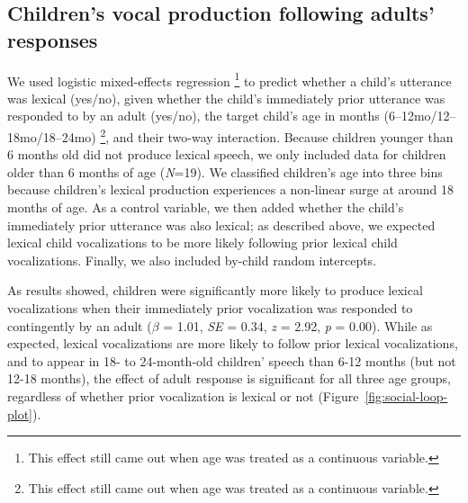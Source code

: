 \documentclass[
  man]{apa6}
\begin{document}
\hypertarget{childrens-vocal-production-following-adults-responses}{%
\subsection{Children's vocal production following adults' responses}\label{childrens-vocal-production-following-adults-responses}}

We used logistic mixed-effects regression \footnote{This effect still came out when age was treated as a continuous variable.} to predict whether a child's utterance was lexical (yes/no), given whether the child's immediately prior utterance was responded to by an adult (yes/no), the target child's age in months (6--12mo/12--18mo/18--24mo) \footnote{This effect still came out when age was treated as a continuous variable.}, and their two-way interaction. Because children younger than 6 months old did not produce lexical speech, we only included data for children older than 6 months of age (\emph{N}=19). We classified children's age into three bins because children's lexical production experiences a non-linear surge at around 18 months of age. As a control variable, we then added whether the child's immediately prior utterance was also lexical; as described above, we expected lexical child vocalizations to be more likely following prior lexical child vocalizations. Finally, we also included by-child random intercepts.

As results showed, children were significantly more likely to produce lexical vocalizations when their immediately prior vocalization was responded to contingently by an adult (\(\beta\) = 1.01, \emph{SE} = 0.34, \emph{z} = 2.92, \emph{p} = 0.00). While as expected, lexical vocalizations are more likely to follow prior lexical vocalizations, and to appear in 18- to 24-month-old children' speech than 6-12 months (but not 12-18 months), the effect of adult response is significant for all three age groups, regardless of whether prior vocalization is lexical or not (Figure~\ref{fig:social-loop-plot}).
\end{document}
